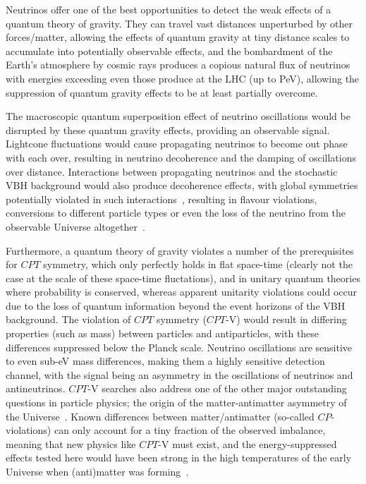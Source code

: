 \documentclass[a4paper,11pt]{article}
\newcounter{bar}
\begin{document}
Neutrinos offer one of the best opportunities to detect the weak effects of a quantum theory of gravity. They can travel vast distances unperturbed by other forces/matter, allowing the effects of quantum gravity at tiny distance scales to accumulate into potentially observable effects, and the bombardment of the Earth's atmosphere by cosmic rays produces a copious natural flux of neutrinos with energies exceeding even those produce at the LHC (up to PeV), allowing the suppression of quantum gravity effects to be at least partially overcome. 

The macroscopic quantum superposition effect of neutrino oscillations would be disrupted by these quantum gravity effects, providing an observable signal. Lightcone fluctuations would cause propagating neutrinos to become out phase with each over, resulting in neutrino decoherence and the damping of oscillations over distance. Interactions between propagating neutrinos and the stochastic VBH background would also produce decoherence effects, with global symmetries potentially violated in such interactions~\cite{Anchordoqui:2005gj, Harlow:2018jwu, PhysRevD.102.115003, Hellmann:2021jyz}, resulting in flavour violations, conversions to different particle types or even the loss of the neutrino from the observable Universe altogether~\cite{Anchordoqui:2005gj, Anchordoqui:2006xv, Witten:2017hdv}.

Furthermore, a quantum theory of gravity violates a number of the prerequisites for $CPT$ symmetry, which only perfectly holds in flat space-time (clearly not the case at the scale of these space-time fluctations), and in unitary quantum theories where probability is conserved, whereas apparent unitarity violations could occur due to the loss of quantum information beyond the event horizons of the VBH background. The violation of $CPT$ symmetry ($CPT$-V) would result in differing properties (such as mass) between particles and antiparticles, with these differences suppressed below the Planck scale. Neutrino oscillations are sensitive to even sub-eV mass differences, making them a highly sensitive detection channel, with the signal being an asymmetry in the oscillations of neutrinos and antineutrinos. $CPT$-V searches also address one of the other major outstanding questions in particle physics; the origin of the matter-antimatter asymmetry of the Universe~\cite{Sakharov_1991}. Known differences between matter/antimatter (so-called $CP$-violations) can only account for a tiny fraction of the observed imbalance, meaning that new physics like $CPT$-V must exist, and the energy-suppressed effects tested here would have been strong in the high temperatures of the early Universe when (anti)matter was forming~\cite{Mavromatos:2017cxr, hep-ph/9809542, Ellis:2013gca}. \\
\end{document}
